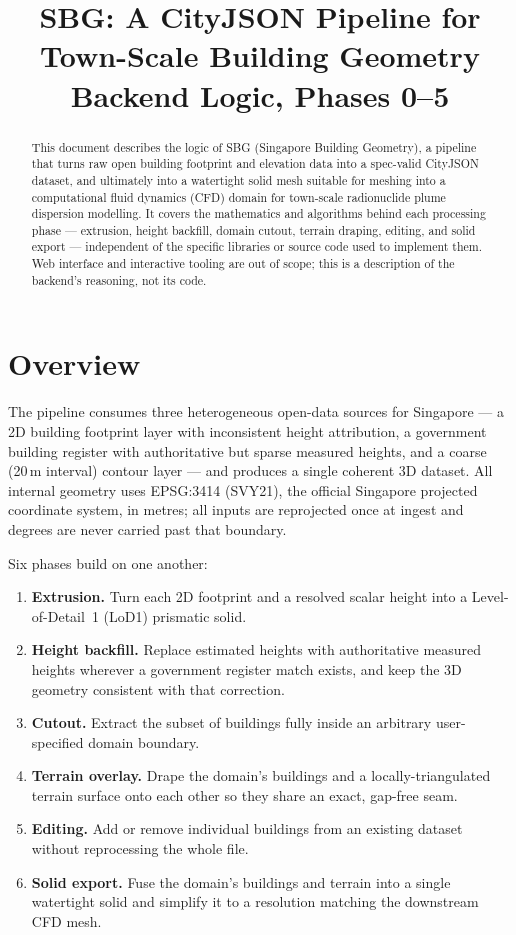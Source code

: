 \documentclass[11pt]{article}
\title{SBG: A CityJSON Pipeline for Town-Scale Building Geometry\\
\large Backend Logic, Phases 0--5}
\author{}
\date{}
\begin{document}
\maketitle

\begin{abstract}
This document describes the logic of SBG (Singapore Building Geometry), a pipeline that
turns raw open building footprint and elevation data into a spec-valid CityJSON dataset,
and ultimately into a watertight solid mesh suitable for meshing into a computational fluid
dynamics (CFD) domain for town-scale radionuclide plume dispersion modelling. It covers the
mathematics and algorithms behind each processing phase --- extrusion, height backfill,
domain cutout, terrain draping, editing, and solid export --- independent of the specific
libraries or source code used to implement them. Web interface and interactive tooling are
out of scope; this is a description of the backend's reasoning, not its code.
\end{abstract}

\tableofcontents

\section{Overview}

The pipeline consumes three heterogeneous open-data sources for Singapore --- a 2D building
footprint layer with inconsistent height attribution, a government building register with
authoritative but sparse measured heights, and a coarse (20\,m interval) contour layer --- and
produces a single coherent 3D dataset. All internal geometry uses EPSG:3414 (SVY21), the
official Singapore projected coordinate system, in metres; all inputs are reprojected once at
ingest and degrees are never carried past that boundary.

Six phases build on one another:

\begin{enumerate}[label=\textbf{Phase \arabic*.}, leftmargin=1.6cm]
  \item \textbf{Extrusion.} Turn each 2D footprint and a resolved scalar height into a
    Level-of-Detail~1 (LoD1) prismatic solid.
  \item \textbf{Height backfill.} Replace estimated heights with authoritative measured
    heights wherever a government register match exists, and keep the 3D geometry consistent
    with that correction.
  \item \textbf{Cutout.} Extract the subset of buildings fully inside an arbitrary
    user-specified domain boundary.
  \item \textbf{Terrain overlay.} Drape the domain's buildings and a locally-triangulated
    terrain surface onto each other so they share an exact, gap-free seam.
  \item \textbf{Editing.} Add or remove individual buildings from an existing dataset without
    reprocessing the whole file.
  \item \textbf{Solid export.} Fuse the domain's buildings and terrain into a single watertight
    solid and simplify it to a resolution matching the downstream CFD mesh.
\end{enumerate}
\end{document}
